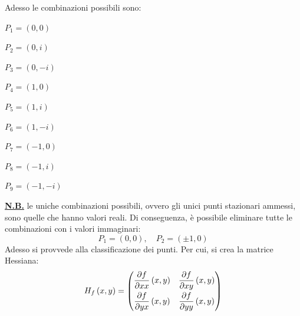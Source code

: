 \documentclass[a4paper]{article}
\makeatletter
\newenvironment{rowequmat}[1]{\left(\array{@{}#1@{}}}{\endarray\right)}
\makeatother
\begin{document}
	Adesso le combinazioni possibili sono:
	\begin{itemize}
		\begin{minipage}{.33\textwidth}
			\item $P_{1} = \left(0, 0\right)$
			\item $P_{2} = \left(0, i\right)$
			\item $P_{3} = \left(0, -i\right)$
		\end{minipage}
		\begin{minipage}{.33\textwidth}
			\item $P_{4} = \left(1, 0\right)$
			\item $P_{5} = \left(1, i\right)$
			\item $P_{6} = \left(1, -i\right)$
		\end{minipage}
		\begin{minipage}{.33\textwidth}
			\item $P_{7} = \left(-1, 0\right)$
			\item $P_{8} = \left(-1, i\right)$
			\item $P_{9} = \left(-1, -i\right)$
		\end{minipage}
	\end{itemize}
	\textbf{\underline{N.B.}} le uniche combinazioni possibili, ovvero gli unici punti stazionari ammessi, sono quelle che hanno valori reali. Di conseguenza, è possibile eliminare tutte le combinazioni con i valori immaginari:
	\begin{equation*}
		P_{1} = \left(0,0\right), \hspace{1em} P_{2} = \left(\pm 1, 0\right)
	\end{equation*}
	Adesso si provvede alla classificazione dei punti. Per cui, si crea la matrice Hessiana:
	\begin{equation*}
		H_f\left(x,y\right) = \begin{rowequmat}{cc}
			\dfrac{\partial f}{\partial xx}\left(x,y\right) & \dfrac{\partial f}{\partial xy}\left(x,y\right) \\ [.8em]
			\dfrac{\partial f}{\partial yx}\left(x,y\right) & \dfrac{\partial f}{\partial yy}\left(x,y\right)
		\end{rowequmat}
	\end{equation*}\newpage
\end{document}
